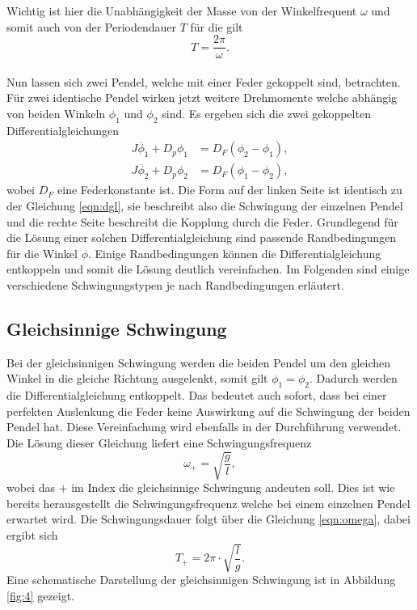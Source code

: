 Wichtig ist hier die Unabhängigkeit der Masse von der Winkelfrequent $\omega$ und somit auch von der Periodendauer $T$ für die gilt
\begin{equation}
    \label{eqn:omega}
T = \frac{2\pi}{\omega}.
\end{equation}
\\
\newline
Nun lassen sich zwei Pendel, welche mit einer Feder gekoppelt sind, betrachten. Für zwei identische Pendel wirken jetzt weitere Drehmomente welche abhängig von beiden Winkeln $\phi_{1}$ und $\phi_{2}$ sind. 
Es ergeben sich die zwei gekoppelten Differentialgleichungen
\begin{align}
    \label{eqn:y1}
    J \ddot{{\phi_{1}}} + D_{p} \phi_{1} &=  D_{F} (\phi_{2}-\phi_{1}), \\
    \label{eqn:y2}
    J \ddot{{\phi_{2}}} + D_{p} \phi_{2} &= D_{F} (\phi_{1} - \phi_{2}),
\end{align}
wobei $D_{F}$ eine Federkonstante ist. Die Form auf der linken Seite ist identisch zu der Gleichung \eqref{eqn:dgl}, sie beschreibt also die Schwingung der einzelnen Pendel und die rechte Seite beschreibt die Kopplung
durch die Feder. Grundlegend für die Lösung einer solchen Differentialgleichung sind passende Randbedingungen für die Winkel $\phi$. Einige Randbedingungen können die Differentialgleichung entkoppeln und somit die Lösung
deutlich vereinfachen. Im Folgenden sind einige verschiedene Schwingungstypen je nach Randbedingungen erläutert.

\subsection{Gleichsinnige Schwingung}
Bei der gleichsinnigen Schwingung werden die beiden Pendel um den gleichen Winkel in die gleiche Richtung ausgelenkt, somit gilt $\phi_{1} = \phi_{2}$. Dadurch werden die Differentialgleichung entkoppelt.
Das bedeutet auch sofort, dass bei einer perfekten Auslenkung die Feder keine Auswirkung auf die Schwingung der beiden Pendel hat. Diese Vereinfachung wird ebenfalls in der Durchführung verwendet.
Die Lösung dieser Gleichung liefert eine Schwingungsfrequenz 
\begin{equation}
    \label{eqn:omegaeasy}
    \omega_{+} = \sqrt{\frac{g}{l}},
\end{equation}
wobei das $+$ im Index die gleichsinnige Schwingung andeuten soll. Dies ist wie bereits herausgestellt die Schwingungsfrequenz welche bei einem einzelnen Pendel erwartet wird.
Die Schwingungsdauer folgt über die Gleichung \eqref{eqn:omega}, dabei ergibt sich
\begin{equation*}
T_{+} = 2\pi \cdot \sqrt{\frac{l}{g}}.
\end{equation*}
Eine schematische Darstellung der gleichsinnigen Schwingung ist in Abbildung \ref{fig:4} gezeigt.

